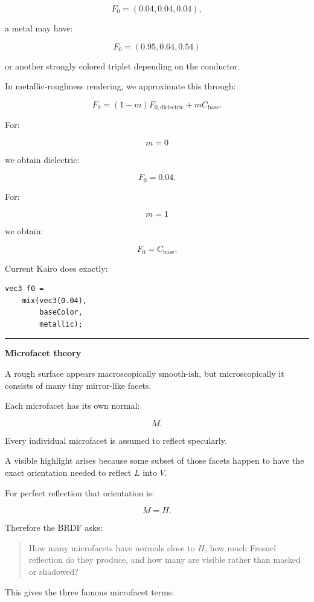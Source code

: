 \[
F_0=(0.04,0.04,0.04),
\]

a metal may have:

\[
F_0=(0.95,0.64,0.54)
\]

or another strongly colored triplet depending on the conductor.

In metallic-roughness rendering, we approximate this through:

\[
\boxed{
F_0=
(1-m)F_{0,\text{dielectric}}
+
mC_{\text{base}}.
}
\]

For:

\[
m=0
\]

we obtain dielectric:

\[
F_0=0.04.
\]

For:

\[
m=1
\]

we obtain:

\[
F_0=C_{\text{base}}.
\]

Current Kairo does exactly:

\begin{verbatim}
vec3 f0 =
    mix(vec3(0.04),
        baseColor,
        metallic);
\end{verbatim}

\begin{center}\rule{0.5\linewidth}{0.5pt}\end{center}

\textbf{Microfacet theory}

A rough surface appears macroscopically smooth-ish, but microscopically it consists of many tiny mirror-like facets.

Each microfacet has its own normal:

\[
M.
\]

Every individual microfacet is assumed to reflect specularly.

A visible highlight arises because some subset of those facets happen to have the exact orientation needed to reflect \(L\) into \(V\).

For perfect reflection that orientation is:

\[
M=H.
\]

Therefore the BRDF asks:

\begin{quote}
How many microfacets have normals close to \(H\), how much Fresnel reflection do they produce, and how many are visible rather than masked or shadowed?
\end{quote}

This gives the three famous microfacet terms:


